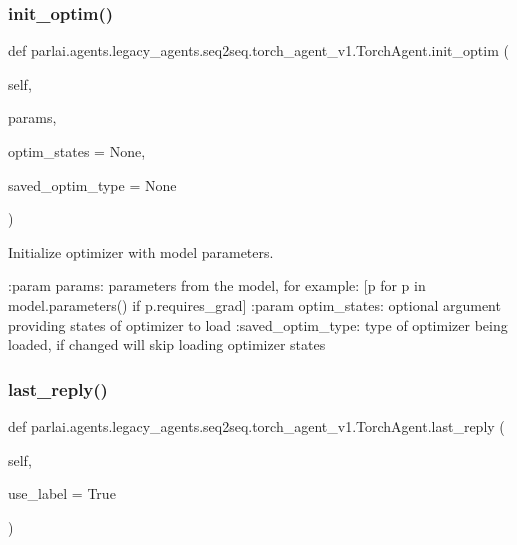 \subsubsection{\texorpdfstring{init\+\_\+optim()}{init\_optim()}}
{\footnotesize\ttfamily def parlai.\+agents.\+legacy\+\_\+agents.\+seq2seq.\+torch\+\_\+agent\+\_\+v1.\+Torch\+Agent.\+init\+\_\+optim (\begin{DoxyParamCaption}\item[{}]{self,  }\item[{}]{params,  }\item[{}]{optim\+\_\+states = {\ttfamily None},  }\item[{}]{saved\+\_\+optim\+\_\+type = {\ttfamily None} }\end{DoxyParamCaption})}

\begin{DoxyVerb}Initialize optimizer with model parameters.

:param params:       parameters from the model, for example:
             [p for p in model.parameters() if p.requires_grad]
:param optim_states: optional argument providing states of optimizer
             to load
:saved_optim_type:   type of optimizer being loaded, if changed will
             skip loading optimizer states
\end{DoxyVerb}
 \mbox{\label{classparlai_1_1agents_1_1legacy__agents_1_1seq2seq_1_1torch__agent__v1_1_1TorchAgent_abf7a50ea0eb319737123d2e46fde4c0f}} 
\subsubsection{\texorpdfstring{last\+\_\+reply()}{last\_reply()}}
{\footnotesize\ttfamily def parlai.\+agents.\+legacy\+\_\+agents.\+seq2seq.\+torch\+\_\+agent\+\_\+v1.\+Torch\+Agent.\+last\+\_\+reply (\begin{DoxyParamCaption}\item[{}]{self,  }\item[{}]{use\+\_\+label = {\ttfamily True} }\end{DoxyParamCaption})}

